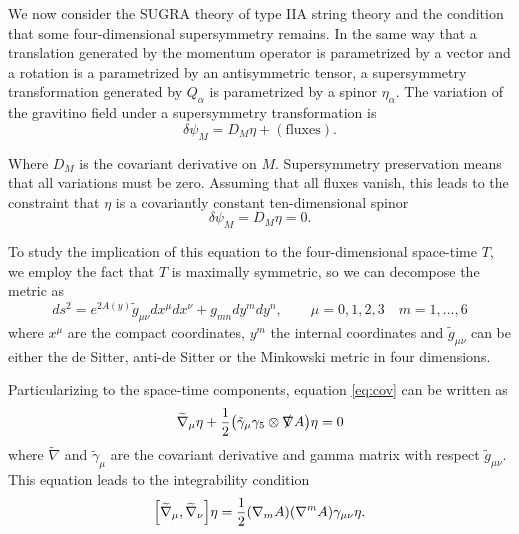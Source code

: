 We now consider the SUGRA theory of type IIA string theory and
the condition that some four-dimensional supersymmetry remains.
In the same way that a translation generated by the momentum operator is parametrized by a vector and
a rotation is a parametrized by an antisymmetric tensor, a supersymmetry transformation generated
by $Q_\alpha$ is parametrized 
by a spinor $\eta_\alpha$.
The variation of the gravitino field under a supersymmetry transformation is
\begin{equation}
  \delta \psi_M = D_M \eta + \mathrm{(fluxes)}.
\end{equation}

Where $D_M$ is the covariant derivative on $M$.
Supersymmetry preservation means that all variations must be zero. 
Assuming that all fluxes vanish, this leads to the constraint that $\eta$ is a covariantly constant ten-dimensional spinor
\begin{equation}
  \delta \psi_M = D_M \eta = 0.
  \label{eq:cov}
\end{equation}

To study the implication of this equation to the four-dimensional space-time $T$, we employ the 
fact that $T$ is maximally symmetric, so we can decompose  the metric as
\begin{equation}
  ds^2=e^{2A(y)}\tilde {g}_{\mu\nu} dx^\mu dx^\nu + g_{mn} dy^m dy^n, \qquad  \mu=0,1,2,3 \quad m=1,\dots,6
\end{equation}
where $x^\mu$ are the compact coordinates, $y^m$ the internal coordinates and $\tilde{g}_{\mu\nu}$ can 
be either the de Sitter, anti-de Sitter or the Minkowski metric in four dimensions.

Particularizing to the space-time components, equation \eqref{eq:cov} can be written as
\begin{equation}
  \widetilde{\nabla}_\mu \eta + \frac{1}{2}\qty(\tilde{\gamma}_\mu \gamma_5 \otimes \slashed \nabla A) \eta=0
\end{equation}
where $\widetilde{\nabla}$ and $\tilde \gamma_\mu$ are the covariant derivative and gamma matrix with respect $\tilde g_{\mu\nu}$.
This equation leads to the integrability condition
\begin{equation}
  \qty[\widetilde \nabla_\mu,\widetilde \nabla_\nu]\eta=\frac{1}{2}\qty(\nabla_m A)\qty(\nabla^m A)\gamma_{\mu\nu}\eta.
  \label{eq:1}
\end{equation}

